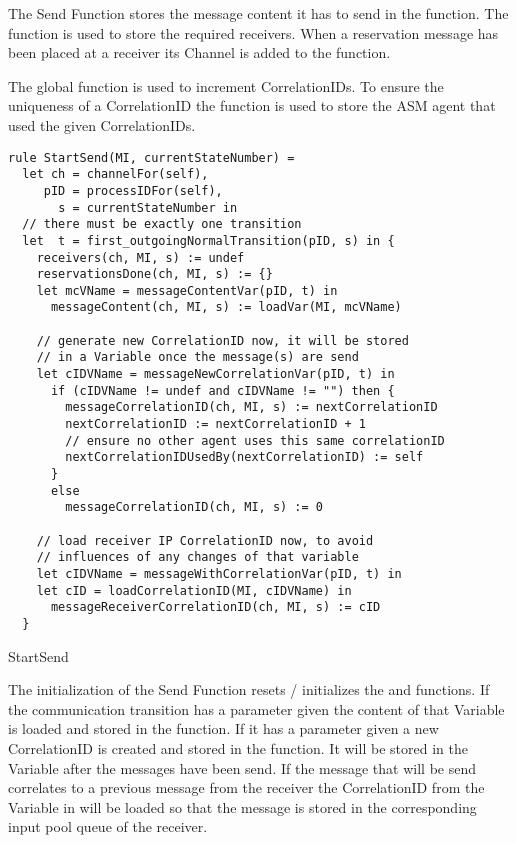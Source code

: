 The Send Function stores the message content it has to send in the
 function. The  function is used to store the required receivers. When a reservation message has been placed at a receiver its Channel is added to the  function.

The global function  is used to increment CorrelationIDs. To ensure the uniqueness of a CorrelationID the  function is used to store the ASM agent that used the given CorrelationIDs.


\begin{listing}[htbp]
\begin{verbatim}
rule StartSend(MI, currentStateNumber) =
  let ch = channelFor(self),
     pID = processIDFor(self),
       s = currentStateNumber in
  // there must be exactly one transition
  let  t = first_outgoingNormalTransition(pID, s) in {
    receivers(ch, MI, s) := undef
    reservationsDone(ch, MI, s) := {}
    let mcVName = messageContentVar(pID, t) in
      messageContent(ch, MI, s) := loadVar(MI, mcVName)

    // generate new CorrelationID now, it will be stored
    // in a Variable once the message(s) are send
    let cIDVName = messageNewCorrelationVar(pID, t) in
      if (cIDVName != undef and cIDVName != "") then {
        messageCorrelationID(ch, MI, s) := nextCorrelationID
        nextCorrelationID := nextCorrelationID + 1
        // ensure no other agent uses this same correlationID
        nextCorrelationIDUsedBy(nextCorrelationID) := self
      }
      else
        messageCorrelationID(ch, MI, s) := 0

    // load receiver IP CorrelationID now, to avoid
    // influences of any changes of that variable
    let cIDVName = messageWithCorrelationVar(pID, t) in
    let cID = loadCorrelationID(MI, cIDVName) in
      messageReceiverCorrelationID(ch, MI, s) := cID
  }
\end{verbatim}
\caption{StartSend}
\label{lst:shortasm:StartSend}
\end{listing}


The initialization of the Send Function resets / initializes the  and  functions. If the communication transition has a  parameter given the content of that Variable is loaded and stored in the  function. If it has a  parameter given a new CorrelationID is created and stored in the  function. It will be stored in the Variable after the messages have been send. If the message that will be send correlates to a previous message from the receiver the CorrelationID from the Variable in  will be loaded so that the message is stored in the corresponding input pool queue of the receiver.


